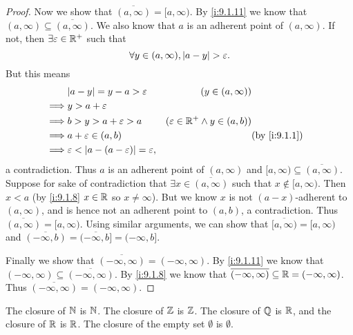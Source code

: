 \begin{proof}
  Now we show that \(\overline{(a, \infty)} = [a, \infty)\).
  By \cref{i:9.1.11} we know that \((a, \infty) \subseteq \overline{(a, \infty)}\).
  We also know that \(a\) is an adherent point of \((a, \infty)\).
  If not, then \(\exists \varepsilon \in \mathbb{R}^+\) such that
  \[
    \forall y \in (a, \infty), \left\lvert a - y\right\rvert > \varepsilon.
  \]
  But this means
  \begin{align}
             & \abs{a - y} = y - a > \varepsilon                        & (y \in (a, \infty))                                      \\
    \implies & y > a + \varepsilon                                                                                                 \\
    \implies & b > y > a + \varepsilon > a                              & (\varepsilon \in \R^+ \land y \in (a, b))                \\
    \implies & a + \varepsilon \in (a, b)                               &                                           & \by{i:9.1.1} \\
    \implies & \varepsilon < \abs{a - (a - \varepsilon)} = \varepsilon,
  \end{align}
  a contradiction.
  Thus \(a\) is an adherent point of \((a, \infty)\) and \([a, \infty) \subseteq \overline{(a, \infty)}\).
  Suppose for sake of contradiction that \(\exists x \in \overline{(a, \infty)}\) such that \(x \notin [a, \infty)\).
  Then \(x < a\) (by \cref{i:9.1.8} \(x \in \mathbb{R}\) so \(x \neq \infty\)).
  But we know \(x\) is not \((a - x)\)-adherent to \((a, \infty)\), and is hence not an adherent point to \((a, b)\), a contradiction.
  Thus \(\overline{(a, \infty)} = [a, \infty)\).
  Using similar arguments, we can show that \(\overline{[a, \infty)} = [a, \infty)\) and \(\overline{(-\infty, b)} = \overline{(-\infty, b]} = (-\infty, b]\).

  Finally we show that \(\overline{(-\infty, \infty)} = (-\infty, \infty)\).
  By \cref{i:9.1.11} we know that \((-\infty, \infty) \subseteq \overline{(-\infty, \infty)}\).
  By \cref{i:9.1.8} we know that \(\overline{(-\infty, \infty)} \subseteq \mathbb{R} = (-\infty, \infty)\).
  Thus \(\overline{(-\infty, \infty)} = (-\infty, \infty)\).
\end{proof}

\begin{lem}\label{i:9.1.13}
  The closure of \(\mathbb{N}\) is \(\mathbb{N}\).
  The closure of \(\mathbb{Z}\) is \(\mathbb{Z}\).
  The closure of \(\mathbb{Q}\) is \(\mathbb{R}\), and the closure of \(\mathbb{R}\) is \(\mathbb{R}\).
  The closure of the empty set \(\emptyset\) is \(\emptyset\).
\end{lem}

